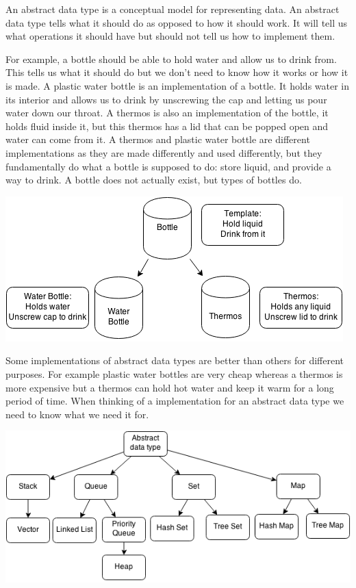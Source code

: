 \documentclass[11pt,oneside]{book}
\makeatletter
\def\maxwidth#1{\ifdim\Gin@nat@width>#1 #1\else\Gin@nat@width\fi}
\makeatother
\begin{document}
An abstract data type is a conceptual model for representing data. An abstract data type tells what it should do as opposed to how it should work. It will tell us what operations it should have but should not tell us how to implement them.

For example, a bottle should be able to hold water and allow us to drink from. This tells us what it should do but we don't need to know how it works or how it is made. A plastic water bottle is an implementation of a bottle. It holds water in its interior and allows us to drink by unscrewing the cap and letting us pour water down our throat. A thermos is also an implementation of the bottle, it holds fluid inside it, but this thermos has a lid that can be popped open and water can come from it. A thermos and plastic water bottle are different implementations as they are made differently and used differently, but they fundamentally do what a bottle is supposed to do: store liquid, and provide a way to drink. A bottle does not actually exist, but types of bottles do.

\includegraphics[width=\maxwidth{\textwidth}]{bottle.png}

Some implementations of abstract data types are better than others for different purposes. For example plastic water bottles are very cheap whereas a thermos is more expensive but a thermos can hold hot water and keep it warm for a long period of time. When thinking of a implementation for an abstract data type we need to know what we need it for.

\includegraphics[width=\maxwidth{\textwidth}]{adt.png}
\end{document}

